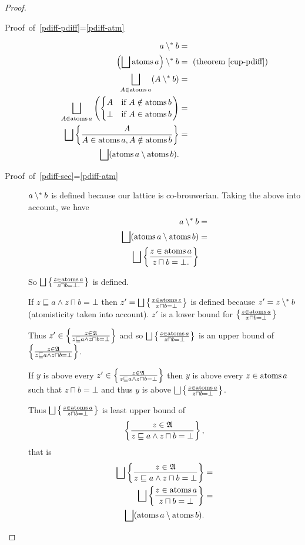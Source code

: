 \begin{proof}
~
\begin{description}
\item [{Proof~of~\ref{pdiff-pdiff}=\ref{pdiff-atm}}] 
\begin{align*}
a\psetminus b & =\\
\left(\bigsqcup\atoms a\right)\psetminus b & =\text{ (theorem \ref{cup-pdiff})}\\
\bigsqcup_{A\in\atoms a}(A\psetminus b) & =\\
\bigsqcup_{A\in\atoms a}\left(\begin{cases}
A & \text{if }A\notin\atoms b\\
\bot & \text{if }A\in\atoms b
\end{cases}\right) & =\\
\bigsqcup\setcond A{A\in\atoms a,A\notin\atoms b} & =\\
\bigsqcup(\atoms a\setminus\atoms b).
\end{align*}

\item [{Proof~of~\ref{pdiff-sec}=\ref{pdiff-atm}}] $a\setminus^{\ast} b$
is defined because our lattice is co-brouwerian. Taking the above
into account, we have
\begin{align*}
a\setminus^{\ast} b & =\\
\bigsqcup(\operatorname{atoms} a\setminus\operatorname{atoms} b) & =\\
\bigsqcup\left\{ \frac{z\in\operatorname{atoms} a}{z\sqcap b=\bot.}\right\}
\end{align*}



So $\bigsqcup\left\{ \frac{z\in\operatorname{atoms} a}{z\sqcap b=\bot.}\right\}$ is defined.


If $z\sqsubseteq a\land z\sqcap b=\bot$ then $z'=\bigsqcup\left\{ \frac{x\in\operatorname{atoms} z}{x\sqcap b=\bot}\right\}$
is defined because $z'=z\setminus^{\ast} b$ (atomisticity taken into account).
$z'$ is a lower bound for $\left\{ \frac{z\in\operatorname{atoms} a}{x\sqcap b=\bot}\right\}$ 


Thus $z'\in\left\{ \frac{z\in\mathfrak{A}}{z\sqsubseteq a\land z\sqcap b=\bot}\right\}$
and so $\bigsqcup\left\{ \frac{z\in\operatorname{atoms} a}{z\sqcap b=\bot}\right\}$ is an upper
bound of $\left\{ \frac{z\in\mathfrak{A}}{z\sqsubseteq a\land z\sqcap b=\bot}\right\}$.


If $y$ is above every $z'\in\left\{ \frac{z\in\mathfrak{A}}{z\sqsubseteq a\land z\sqcap b=\bot}\right\}$
then $y$ is above every $z\in\operatorname{atoms} a$ such that $z\sqcap b=\bot$
and thus $y$ is above $\bigsqcup\left\{ \frac{z\in\operatorname{atoms} a}{z\sqcap b=\bot}\right\}$.


Thus $\bigsqcup\left\{ \frac{z\in\operatorname{atoms} a}{z\sqcap b=\bot}\right\}$ is least upper
bound of
\[
\left\{ \frac{z\in\mathfrak{A}}{z\sqsubseteq a\land z\sqcap b=\bot}\right\},
\]
that is
\begin{align*}
\bigsqcup\left\{ \frac{z\in\mathfrak{A}}{z\sqsubseteq a\land z\sqcap b=\bot}\right\} & =\\
\bigsqcup\left\{ \frac{z\in\operatorname{atoms} a}{z\sqcap b=\bot}\right\} & =\\
\bigsqcup(\operatorname{atoms} a\setminus\operatorname{atoms} b).
\end{align*}


\end{description}
\end{proof}

